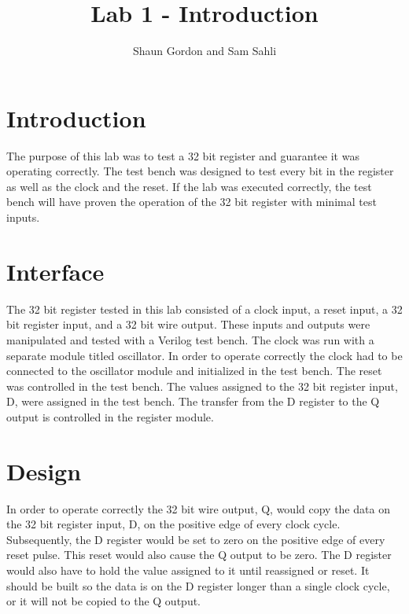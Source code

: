 \documentclass{article}
\author{Shaun Gordon and Sam Sahli}
\title{Lab 1 - Introduction}
\begin{document}
\maketitle

\section{Introduction}
The purpose of this lab was to test a 32 bit register and guarantee it was operating correctly. The test bench was designed to test every bit in the register as well as the clock and the reset. If the lab was executed correctly, the test bench will have proven the operation of the 32 bit register with minimal test inputs.

\section{Interface}
The 32 bit register tested in this lab consisted of a clock input, a reset input, a 32 bit register input, and a 32 bit wire output. These inputs and outputs were manipulated and tested with a Verilog test bench. The clock was run with a separate module titled oscillator. In order to operate correctly the clock had to be connected to the oscillator module and initialized in the test bench. The reset was controlled in the test bench. The values assigned to the 32 bit register input, D, were assigned in the test bench. The transfer from the D register to the Q output is controlled in the register module. 

\section{Design}
In order to operate correctly the 32 bit wire output, Q, would copy the data on the 32 bit register input, D, on the positive edge of every clock cycle. Subsequently, the D register would be set to zero on the positive edge of every reset pulse. This reset would also cause the Q output to be zero. The D register would also have to hold the value assigned to it until reassigned or reset. It should be built so the data is on the D register longer than a single clock cycle, or it will not be copied to the Q output. 
\end{document}
